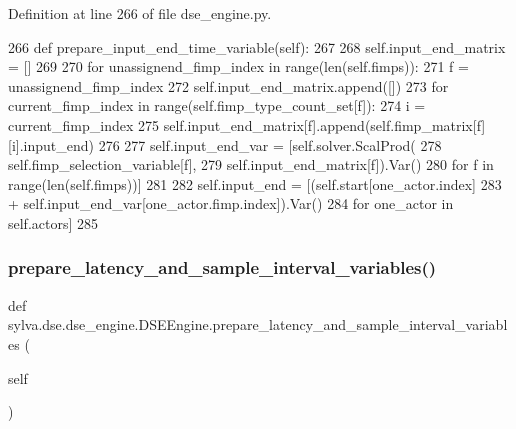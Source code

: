Definition at line 266 of file dse\+\_\+engine.\+py.


\begin{DoxyCode}
266     \textcolor{keyword}{def }prepare\_input\_end\_time\_variable(self):
267 
268         self.input\_end\_matrix = []
269 
270         \textcolor{keywordflow}{for} unassignend\_fimp\_index \textcolor{keywordflow}{in} range(len(self.fimps)):
271             f = unassignend\_fimp\_index
272             self.input\_end\_matrix.append([])
273             \textcolor{keywordflow}{for} current\_fimp\_index \textcolor{keywordflow}{in} range(self.fimp\_type\_count\_set[f]):
274                 i = current\_fimp\_index
275                 self.input\_end\_matrix[f].append(self.fimp\_matrix[f][i].input\_end)
276 
277         self.input\_end\_var = [self.solver.ScalProd(
278             self.fimp\_selection\_variable[f],
279             self.input\_end\_matrix[f]).Var()
280             \textcolor{keywordflow}{for} f \textcolor{keywordflow}{in} range(len(self.fimps))]
281 
282         self.input\_end = [(self.start[one\_actor.index]
283                            + self.input\_end\_var[one\_actor.fimp.index]).Var()
284                           \textcolor{keywordflow}{for} one\_actor \textcolor{keywordflow}{in} self.actors]
285 
\end{DoxyCode}
\mbox{\label{classsylva_1_1dse_1_1dse__engine_1_1_d_s_e_engine_afda19a625b733636e59c1dec52478357}} 
\subsubsection{\texorpdfstring{prepare\+\_\+latency\+\_\+and\+\_\+sample\+\_\+interval\+\_\+variables()}{prepare\_latency\_and\_sample\_interval\_variables()}}
{\footnotesize\ttfamily def sylva.\+dse.\+dse\+\_\+engine.\+D\+S\+E\+Engine.\+prepare\+\_\+latency\+\_\+and\+\_\+sample\+\_\+interval\+\_\+variables (\begin{DoxyParamCaption}\item[{}]{self }\end{DoxyParamCaption})}



